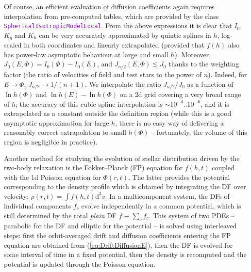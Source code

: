 \documentclass[12pt]{article}
\newcommand{\ttt}[1]{\textcolor{darkviolet}{\texttt{#1}}}
\renewcommand{\d}{\mathrm{d}}
\begin{document}
Of course, an efficient evaluation of diffusion coefficients again requires interpolation from pre-computed tables, which are provided by the class \ttt{SphericalIsotropicModelLocal}. From the above expressions it is clear that $I_0$, $K_g$ and $K_h$ can be very accurately approximated by quintic splines in $h$, log-scaled in both coordinates and linearly extrapolated (provided that $f(h)$ also has power-law asymptotic behaviour at large and small $h$). 
Moreover, $J_0(E,\Phi) = I_0(\Phi)-I_0(E)$, and $J_{n/2}(E,\Phi)\lesssim J_0$ thanks to the weighting factor (the ratio of velocities of field and test stars to the power of $n$). Indeed, for $E\to\Phi$, $J_{n/2} \to 1/(n+1)$. We interpolate the ratio $J_{n/2}/J_0$ as a function of $\ln h(\Phi)$ and $\ln h(E)-\ln h(\Phi)$ on a 2d grid covering a very broad range of $h$; the accuracy of this cubic spline interpolation is $\sim 10^{-4}..10^{-6}$, and it is extrapolated as a constant outside the definition region (while this is a good asymptotic approximation for large $h$, there is no easy way of delivering a reasonably correct extrapolation to small $h(\Phi)$ -- fortunately, the volume of this region is negligible in practice).

Another method for studying the evolution of stellar distribution driven by the two-body relaxation is the Fokker--Planck (FP) equation for $f(h,t)$ coupled with the 1d Poisson equation for $\Phi(r,t)$. The latter provides the potential corresponding to the density profile which is obtained by integrating the DF over velocity: $\rho(r,t)=\int f(h,t) \d ^3v$. In a multicomponent system, the DFs of individual components $f_c$ evolve independently in a common potential, which is still determined by the total \textsl{plain} DF $f\equiv \sum_{c} f_c$.
This system of two PDEs -- parabolic for the DF and elliptic for the potential -- is solved using interleaved steps: first the orbit-averaged drift and diffusion coefficients entering the FP equation are obtained from (\ref{eq:DriftDiffusionE}), then the DF is evolved for some interval of time in a fixed potential, then the density is recomputed and the potential is updated through the Poisson equation.
\end{document}
